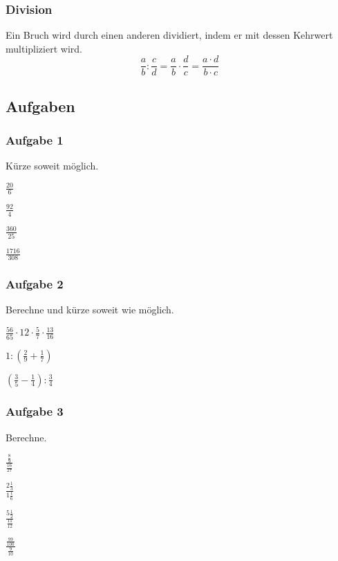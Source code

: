 \subsubsection{Division}
Ein Bruch wird durch einen anderen dividiert, indem er mit dessen Kehrwert multipliziert wird.
\[\frac{a}{b} : \frac{c}{d} = \frac{a}{b} \cdot \frac{d}{c} = \frac{a \cdot d}{b \cdot c}\] 



\newpage
\subsection{Aufgaben}
\subsubsection{Aufgabe 1}
Kürze soweit möglich.
\begin{enumerate}
\begin{multicols}{4}
	\item \quad $ \frac{20}{6} $
	\item \quad $ \frac{92}{4} $
	\item \quad $ \frac{360}{25} $
	\item \quad $ \frac{1716}{308} $
\end{multicols}
\end{enumerate}

\subsubsection{Aufgabe 2}
Berechne und kürze soweit wie möglich.
\begin{enumerate}
\begin{multicols}{2}
	\item \quad $ \frac{56}{65} \cdot 12 \cdot \frac{5}{7} \cdot \frac{13}{16} $
	\item \quad $ 1 : \left( \frac{2}{9} + \frac{1}{7} \right) $
	\item \quad $ \left( \frac{3}{5} - \frac{1}{4} \right) : \frac{3}{4} $
\end{multicols} 
\end{enumerate}

\subsubsection{Aufgabe 3}
Berechne.
\begin{enumerate}
\begin{multicols}{4}
	\item \quad $ \frac{\frac{8}{9}}{\frac{16}{27}} $
	\item \quad $ \frac{2\frac{1}{3}}{1\frac{1}{6}} $
	\item \quad $ \frac{5\frac{1}{2}}{\frac{11}{12}} $
	\item \quad $ \frac{\frac{99}{100}}{\frac{9}{10}} $
\end{multicols} 
\end{enumerate}

